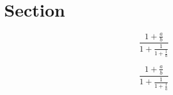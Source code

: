 \documentclass[a4paper]{article}
\begin{document}
\section{Section}

\[ \frac{1+\frac{a}{b}}{1+\frac{1}{1+\frac{1}{a}}} \]

\[ \frac{1+\frac{a}{b}}{1+\frac{1}{1+\frac{1}{a}}} \]
\end{document}
